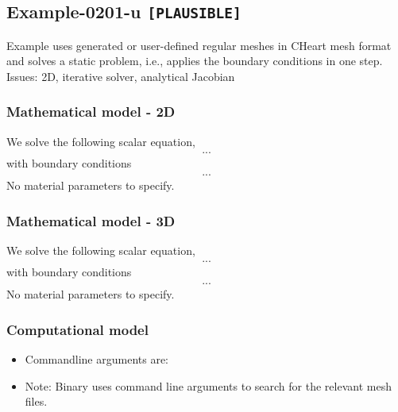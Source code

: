 %
\clearpage
%
\subsection{Example-0201-u \texttt{[PLAUSIBLE]}}
%
Example uses generated or user-defined regular meshes in CHeart mesh format
and solves a static problem, i.e., applies the boundary conditions in one step.\\[3ex]

Issues: 2D, iterative solver, analytical Jacobian
%
%
\subsubsection{Mathematical model - 2D}
%
We solve the following scalar equation,
%
\begin{align}
    ...
\end{align}
%
with boundary conditions
%
\begin{align}
    ...
\end{align}
%
No material parameters to specify.
%
%
\subsubsection{Mathematical model - 3D}
%
We solve the following scalar equation,
%
\begin{align}
    ...
\end{align}
%
with boundary conditions
%
\begin{align}
    ...
\end{align}
%
No material parameters to specify.
%
%
\subsubsection{Computational model}
%
\begin{itemize}
    \item{Commandline arguments are:}
        \subitem{}%
    \item{Note: Binary uses command line arguments to search for the relevant mesh files.}
\end{itemize}
%
%
